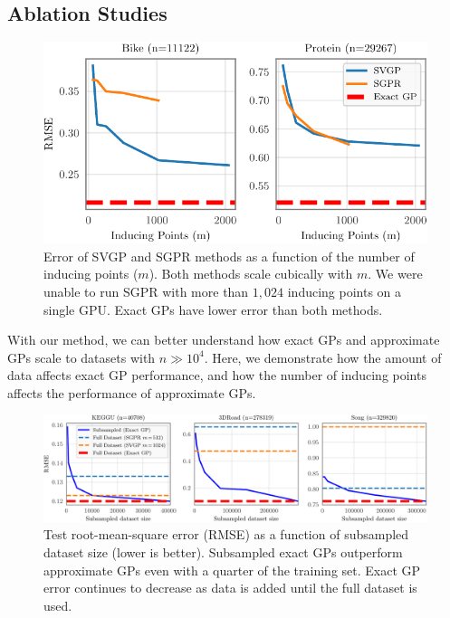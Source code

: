 \subsection{Ablation Studies}
\begin{figure}[!t]
  \centering
  \includegraphics[width=0.8\linewidth]{figures/inducing_points.pdf}
  \caption{
    Error of SVGP and SGPR methods as a function of the number of inducing points
    ($m$).  Both methods scale cubically with $m$.
    We were unable to run SGPR with more than $1,\!024$ inducing points on a single GPU.
    Exact GPs have lower error than both methods.
  }
  \label{fig:num_inducing_points}
\end{figure}
With our method, we can better understand how exact GPs and approximate GPs scale to datasets with $n\gg 10^4$.
Here, we demonstrate how the amount of data affects exact GP performance, and
how the number of inducing points affects the performance of approximate GPs.
\begin{figure}[t!]
  \centering
  \includegraphics[width=\linewidth]{figures/subsampling.pdf}
  \caption{
    Test root-mean-square error (RMSE) as a function of subsampled dataset size (lower is better).
    Subsampled exact GPs outperform approximate GPs even with a quarter of the training set.
    Exact GP error continues to decrease as data is added until the full dataset is used.
  }
  \label{fig:subsampling_results}
\end{figure}

